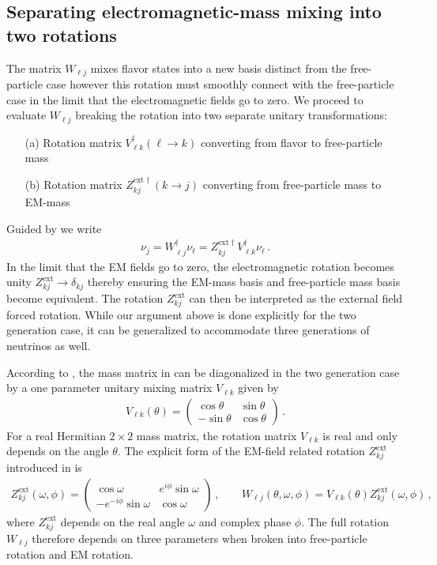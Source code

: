 \subsection{Separating electromagnetic-mass mixing into two rotations}
\label{sec:zmixing}
The matrix $W_{\ell j}$ mixes flavor states into a new basis distinct from the free-particle case however this rotation must smoothly connect with the free-particle case in the limit that the electromagnetic fields go to zero. We proceed to evaluate $W_{\ell j}$ breaking the rotation into two separate unitary transformations:
\begin{itemize}[nosep]
    \item [(a)] Rotation matrix $V_{\ell k}^{\dag}(\ell\rightarrow k)$ converting from flavor to free-particle mass
    \item [(b)] Rotation matrix $Z_{kj}^{\mathrm{ext}\dag}(k\rightarrow j)$ converting from free-particle mass to EM-mass
\end{itemize}
Guided by  we write
\begin{align}
\label{zrot:1}
\nu_{j} = W^{\dag}_{\ell j}\nu_{\ell} = Z_{kj}^{\mathrm{ext}\dag}V_{\ell k}^{\dag}\nu_{\ell}\,.
\end{align}
In the limit that the EM fields go to zero, the electromagnetic rotation becomes unity $Z_{kj}^\mathrm{ext}\rightarrow\delta_{kj}$ thereby ensuring the EM-mass basis and free-particle mass basis become equivalent. The rotation $Z_{kj}^\mathrm{ext}$ can then be interpreted as the external field forced rotation. While our argument above is done explicitly for the two generation case, it can be generalized to accommodate three generations of neutrinos as well.

According to , the mass matrix in  can be diagonalized in the two generation case by a one parameter unitary mixing matrix $V_{\ell k}$ given by
\begin{align}
\label{rot:1}
V_{\ell k}(\theta)=
\begin{pmatrix}
\cos\theta & \sin\theta\\
-\sin\theta & \cos\theta
\end{pmatrix}\,.
\end{align}
For a real Hermitian $2\times 2$ mass matrix, the rotation matrix $V_{\ell k}$ is real and only depends on the angle $\theta$. The explicit form of the EM-field related rotation $Z_{kj}^\mathrm{ext}$ introduced in  is
\begin{align}
\label{zrot:2}
Z_{kj}^\mathrm{ext}(\omega,\phi)=
\begin{pmatrix}
\cos\omega & e^{i\phi}\sin\omega\\
-e^{-i\phi}\sin\omega & \cos\omega
\end{pmatrix}\,,\qquad
W_{\ell j}(\theta,\omega,\phi)=V_{\ell k}(\theta)Z_{kj}^\mathrm{ext}(\omega,\phi)\,,
\end{align}
where $Z_{kj}^\mathrm{ext}$ depends on the real angle $\omega$ and complex phase $\phi$. The full rotation $W_{\ell j}$ therefore depends on three parameters when broken into free-particle rotation and EM rotation.

